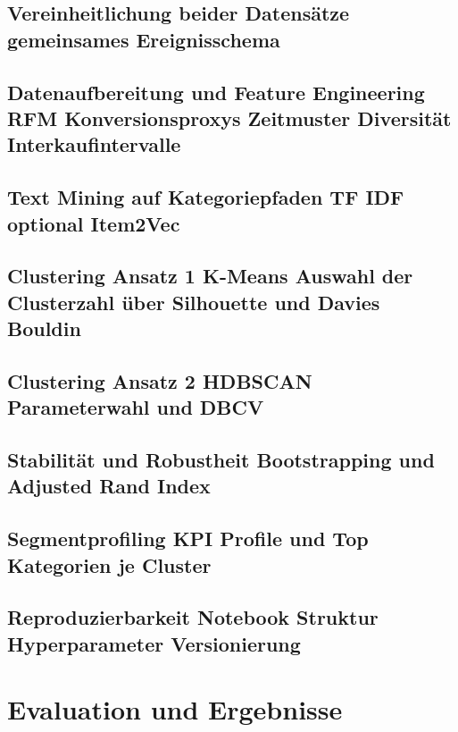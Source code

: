 \documentclass[
  11pt,
  openany, oneside]{book}
\begin{document}
\section{Vereinheitlichung beider Datensätze gemeinsames
Ereignisschema}\label{sec-datenvereinheitlichung}

\section{Datenaufbereitung und Feature Engineering RFM Konversionsproxys
Zeitmuster Diversität Interkaufintervalle}\label{sec-datenaufbereitung}

\section{Text Mining auf Kategoriepfaden TF IDF optional
Item2Vec}\label{sec-textmining}

\section{Clustering Ansatz 1 K-Means Auswahl der Clusterzahl über
Silhouette und Davies Bouldin}\label{sec-clustering1}

\section{Clustering Ansatz 2 HDBSCAN Parameterwahl und
DBCV}\label{sec-clustering2}

\section{Stabilität und Robustheit Bootstrapping und Adjusted Rand
Index}\label{sec-stabilitaet}

\section{Segmentprofiling KPI Profile und Top Kategorien je
Cluster}\label{sec-segmentprofiling}

\section{Reproduzierbarkeit Notebook Struktur Hyperparameter
Versionierung}\label{sec-reproduzierbarkeit}

\chapter{Evaluation und Ergebnisse}\label{evaluation-und-ergebnisse}
\end{document}
